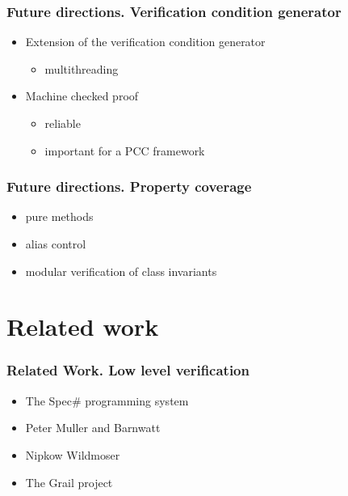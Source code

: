 \documentclass{beamer}
\begin{document}
\begin{frame}\frametitle{Future directions. Verification condition generator }
         \begin{itemize}	   
	    \item Extension of the verification condition generator 
                 \begin{itemize}
	             \item multithreading
		  \end{itemize}
           \item Machine checked proof
                 \begin{itemize}
	             \item reliable
		       \item important for a PCC framework
		  \end{itemize}
          \end{itemize}
\end{frame}




\begin{frame}\frametitle{Future directions. Property coverage  }
	   
                  \begin{itemize}
	                \item pure methods 
			  \item alias control
			  \item modular verification of class invariants
			    
		   \end{itemize}  

\end{frame}


\section{Related work}

\begin{frame}\frametitle{Related Work. Low level verification}


 \begin{itemize}
   \item The Spec\# programming system

     \item Peter Muller and Barnwatt

     \item Nipkow Wildmoser

      \item  The Grail project 
\end{itemize}

\end{frame}
\end{document}

